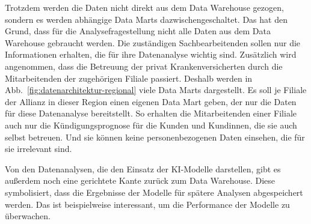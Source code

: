 Trotzdem werden die Daten nicht direkt aus dem Data Warehouse
gezogen, sondern es werden abhängige Data Marts dazwischengeschaltet.
Das hat den Grund, dass für die Analysefragestellung
nicht alle Daten aus dem Data Warehouse gebraucht werden.
Die zuständigen Sachbearbeitenden sollen nur die Informationen
erhalten, die für ihre Datenanalyse wichtig sind. 
Zusätzlich wird angenommen, dass die Betreuung der
privat Krankenversicherten durch die Mitarbeitenden
der zugehörigen Filiale passiert.
Deshalb werden in Abb.~\ref{fig:datenarchitektur-regional} 
viele Data Marts dargestellt.
Es soll je Filiale der Allianz in dieser Region einen eigenen 
Data Mart geben, der nur die Daten für diese Datenanalyse bereitstellt.
So erhalten die Mitarbeitenden einer Filiale auch nur 
die Kündigungsprognose für die Kunden und Kundinnen, 
die sie auch selbst betreuen. 
Und sie können keine personenbezogenen Daten
einsehen, die für sie irrelevant sind.

Von den Datenanalysen, die den Einsatz der KI-Modelle darstellen,
gibt es außerdem noch eine gerichtete Kante zurück zum Data Warehouse.
Diese symbolisiert, dass die Ergebnisse der Modelle für spätere Analysen 
abgespeichert werden.
Das ist beispielweise interessant, um die Performance der Modelle zu überwachen.